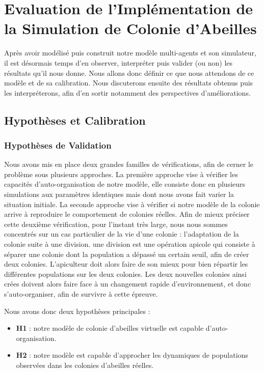 \chapter{Evaluation de l'Implémentation de la Simulation de Colonie d'Abeilles}
\label{ChapitreEvalSMA}
	Après avoir modélisé puis construit notre modèle multi-agents et son simulateur, il est désormais temps d'en observer, interpréter puis valider (ou non) les résultats qu'il nous donne. Nous allons donc définir ce que nous attendons de ce modèle et de sa calibration. Nous discuterons ensuite des résultats obtenus puis les interpréterons, afin d'en sortir notamment des perspectives d'améliorations.
	
	\section{Hypothèses et Calibration}
		\subsection{Hypothèses de Validation}
			Nous avons mis en place deux grandes familles de vérifications, afin de cerner le problème sous plusieurs approches. La première approche vise à vérifier les capacités d'auto-organisation de notre modèle, elle consiste donc en plusieurs simulations aux paramètres identiques mais dont nous avons fait varier la situation initiale. La seconde approche vise à vérifier si notre modèle de la colonie arrive à reproduire le comportement de colonies réelles. Afin de mieux préciser cette deuxième vérification, pour l'instant très large, nous nous sommes concentrés sur un cas particulier de la vie d'une colonie : l'adaptation de la colonie suite à une division. une division est une opération apicole qui consiste à séparer une colonie dont la population a dépassé un certain seuil, afin de créer deux colonies. L'apiculteur doit alors faire de son mieux pour bien répartir les différentes populations sur les deux colonies. Les deux nouvelles colonies ainsi crées doivent alors faire face à un changement rapide d'environnement, et donc s'auto-organiser, afin de survivre à cette épreuve.
			
			Nous avons donc deux hypothèses principales :
			\begin{itemize}
				\item \textbf{H1} : notre modèle de colonie d'abeilles virtuelle est capable d'auto-organisation.
				\item \textbf{H2} : notre modèle est capable d'approcher les dynamiques de populations observées dans les colonies d'abeilles réelles.
			\end{itemize}
			
